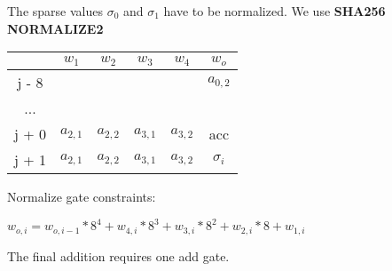 The sparse values $\sigma_0$ and $\sigma_1$ have to be normalized.
We use \textbf{SHA256 NORMALIZE2}
\begin{center}
\begin{tabular}{ |c|c|c|c|c|c } 
  & $w_1$ & $w_2$ & $w_3$ & $w_4$ & $w_o$\\ 
 \hline
j - 8 &  &  &  &  & $a_{0, 2}$\\ 
... &&&&& \\
j + 0 & $a_{2,1}$ & $ a_{2,2}$ & $a_{3,1}$ & $a_{3,2}$ & acc\\ 
j + 1 & $a_{2,1}$ & $ a_{2,2}$ & $a_{3,1}$ & $a_{3,2}$ & $\sigma_i$ \\ 
 \hline
\end{tabular}
\end{center}

Normalize gate constraints:
\begin{center}
$w_{o,i} = w_{o, i - 1} * 8^4 + w_{4,i}*8^3 + w_{3,i}* 8^2 + w_{2,i} * 8 + w_{1,i}$
\end{center}

The final addition requires one add gate.

